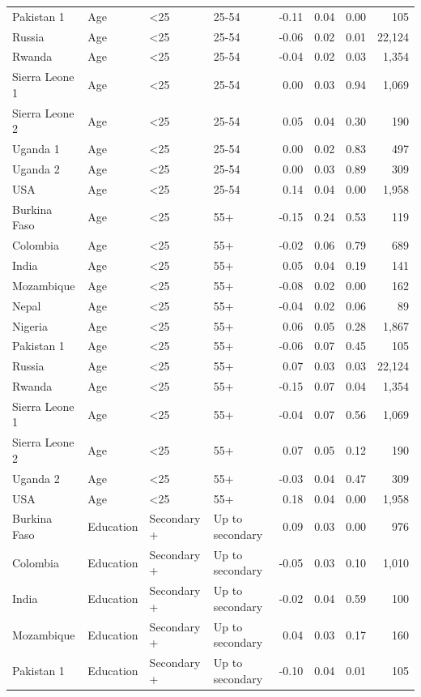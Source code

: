 \documentclass[
  12pt,
]{article}
\begin{document}
\begin{table}
{\begin{threeparttable}
\begin{tabular}[t]{llllrrrr}
Pakistan 1 & Age & <25 & 25-54 & -0.11 & 0.04 & 0.00 & 105\\
Russia & Age & <25 & 25-54 & -0.06 & 0.02 & 0.01 & 22,124\\
Rwanda & Age & <25 & 25-54 & -0.04 & 0.02 & 0.03 & 1,354\\
Sierra Leone 1 & Age & <25 & 25-54 & 0.00 & 0.03 & 0.94 & 1,069\\
Sierra Leone 2 & Age & <25 & 25-54 & 0.05 & 0.04 & 0.30 & 190\\
Uganda 1 & Age & <25 & 25-54 & 0.00 & 0.02 & 0.83 & 497\\
Uganda 2 & Age & <25 & 25-54 & 0.00 & 0.03 & 0.89 & 309\\
USA & Age & <25 & 25-54 & 0.14 & 0.04 & 0.00 & 1,958\\
Burkina Faso & Age & <25 & 55+ & -0.15 & 0.24 & 0.53 & 119\\
Colombia & Age & <25 & 55+ & -0.02 & 0.06 & 0.79 & 689\\
India & Age & <25 & 55+ & 0.05 & 0.04 & 0.19 & 141\\
Mozambique & Age & <25 & 55+ & -0.08 & 0.02 & 0.00 & 162\\
Nepal & Age & <25 & 55+ & -0.04 & 0.02 & 0.06 & 89\\
Nigeria & Age & <25 & 55+ & 0.06 & 0.05 & 0.28 & 1,867\\
Pakistan 1 & Age & <25 & 55+ & -0.06 & 0.07 & 0.45 & 105\\
Russia & Age & <25 & 55+ & 0.07 & 0.03 & 0.03 & 22,124\\
Rwanda & Age & <25 & 55+ & -0.15 & 0.07 & 0.04 & 1,354\\
Sierra Leone 1 & Age & <25 & 55+ & -0.04 & 0.07 & 0.56 & 1,069\\
Sierra Leone 2 & Age & <25 & 55+ & 0.07 & 0.05 & 0.12 & 190\\
Uganda 2 & Age & <25 & 55+ & -0.03 & 0.04 & 0.47 & 309\\
USA & Age & <25 & 55+ & 0.18 & 0.04 & 0.00 & 1,958\\
Burkina Faso & Education & Secondary + & Up to secondary & 0.09 & 0.03 & 0.00 & 976\\
Colombia & Education & Secondary + & Up to secondary & -0.05 & 0.03 & 0.10 & 1,010\\
India & Education & Secondary + & Up to secondary & -0.02 & 0.04 & 0.59 & 100\\
Mozambique & Education & Secondary + & Up to secondary & 0.04 & 0.03 & 0.17 & 160\\
Pakistan 1 & Education & Secondary + & Up to secondary & -0.10 & 0.04 & 0.01 & 105\\

\end{tabular}
\end{threeparttable}}
\end{table}
\end{document}
